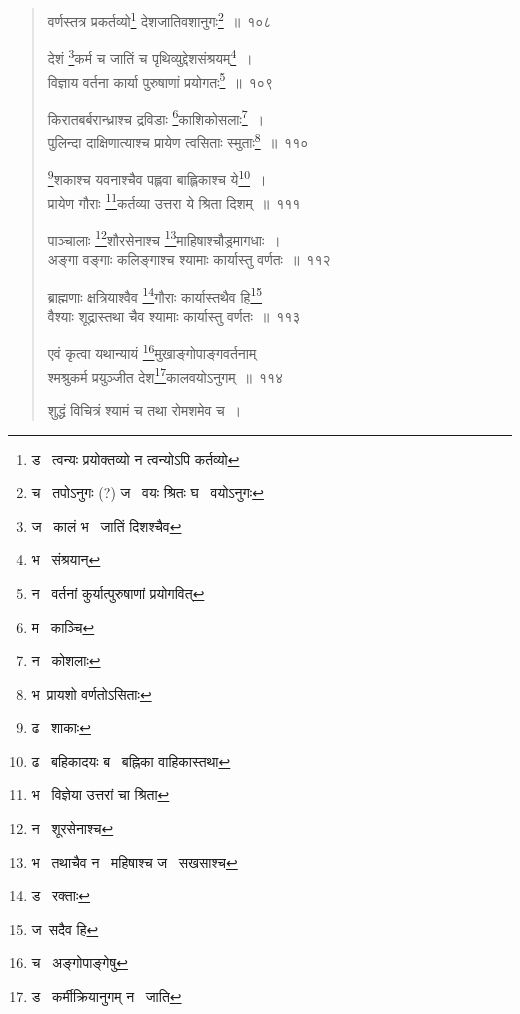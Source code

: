\documentclass[11pt, openany]{book}
\begin{document}
\newpage

\begin{quote}
{\na वर्णस्तत्र प्रकर्तव्यो\renewcommand{\thefootnote}{1}\footnote{ड \textendash\ त्वन्यः प्रयोक्तव्यो न त्वन्योऽपि कर्तव्यो} देशजातिवशानुगः\renewcommand{\thefootnote}{2}\footnote{च \textendash\ तपोऽनुगः (?) ज \textendash\ वयः श्रितः घ \textendash\ वयोऽनुगः}~॥~१०८

देशं \renewcommand{\thefootnote}{3}\footnote{ज \textendash\ कालं भ \textendash\ जातिं दिशश्चैव}कर्म च जातिं च पृथिव्युद्देशसंश्रयम्\renewcommand{\thefootnote}{4}\footnote{भ \textendash\ संश्रयान्}~।\\
विज्ञाय वर्तना कार्या पुरुषाणां प्रयोगतः\renewcommand{\thefootnote}{5}\footnote{न \textendash\ वर्तनां कुर्यात्पुरुषाणां प्रयोगवित्}~॥~१०९

किरातबर्बरान्ध्राश्च द्रविडाः \renewcommand{\thefootnote}{6}\footnote{म \textendash\ काञ्चि}काशिकोसलाः\renewcommand{\thefootnote}{7}\footnote{न \textendash\ कोशलाः}~।\\
पुलिन्दा दाक्षिणात्याश्च प्रायेण त्वसिताः स्मुताः\renewcommand{\thefootnote}{8}\footnote{भ\textendash\ प्रायशो वर्णतोऽसिताः}~॥~११०

\renewcommand{\thefootnote}{9}\footnote{ढ \textendash\ शाकाः}शकाश्च यवनाश्चैव पह्लवा बाह्लिकाश्च ये\renewcommand{\thefootnote}{10}\footnote{ढ \textendash\ बहिकादयः ब \textendash\ बह्निका वाहिकास्तथा}~।\\
प्रायेण गौराः \renewcommand{\thefootnote}{11}\footnote{भ \textendash\ विज्ञेया उत्तरां चा श्रिता}कर्तव्या उत्तरा ये श्रिता दिशम्~॥~१११

पाञ्चालाः \renewcommand{\thefootnote}{12}\footnote{न \textendash\ शूरसेनाश्च}शौरसेनाश्च \renewcommand{\thefootnote}{13}\footnote{भ \textendash\ तथाचैव न \textendash\ महिषाश्च ज \textendash\ सखसाश्च}माहिषाश्चौड्रमागधाः~।\\
अङ्गा वङ्गाः कलिङ्गाश्च श्यामाः कार्यास्तु वर्णतः~॥~११२

ब्राह्मणाः क्षत्रियाश्वैव \renewcommand{\thefootnote}{14}\footnote{ड \textendash\ रक्ताः}गौराः कार्यास्तथैव हि\renewcommand{\thefootnote}{15}\footnote{ज\textendash\ सदैव हि}\\
वैश्याः शूद्रास्तथा चैव श्यामाः कार्यास्तु वर्णतः~॥~११३

एवं कृत्वा यथान्यायं \renewcommand{\thefootnote}{16}\footnote{च \textendash\ अङ्गोपाङ्गेषु}मुखाङ्गोपाङ्गवर्तनाम्\\
श्मश्रुकर्म प्रयुञ्जीत देश\renewcommand{\thefootnote}{17}\footnote{ड \textendash\ कर्मीक्रियानुगम् न \textendash\ जाति}कालवयोऽनुगम्~॥~११४

शुद्धं विचित्रं श्यामं च तथा रोमशमेव च~।}
\end{quote}
\end{document}
